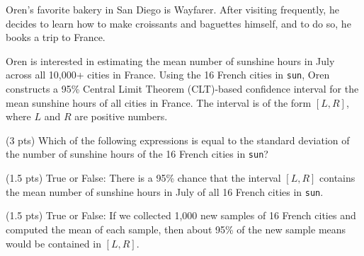 

    


\newpage

\begin{prob}[(17 pts)]

Oren's favorite bakery in San Diego is Wayfarer. After visiting frequently, he decides to learn how to make croissants and baguettes himself, and to do so, he books a trip to France.

Oren is interested in estimating the mean number of sunshine hours in July across all 10,000+ cities in France. Using the 16 French cities in \texttt{sun}, Oren constructs a 95\% Central Limit Theorem (CLT)-based confidence interval for the mean sunshine hours of all cities in France. The interval is of the form $[L, R]$, where $L$ and $R$ are positive numbers.

\begin{subprobset}

\begin{subprob}(3 pts) Which of the following expressions is equal to the standard deviation of the number of sunshine hours of the 16 French cities in \texttt{sun}?


\end{subprob}

\begin{subprob}(1.5 pts) True or False: There is a 95\% chance that the interval $[L, R]$ contains the mean number of sunshine hours in July of all 16 French cities in \texttt{sun}.


\end{subprob}

\begin{subprob}(1.5 pts) True or False: If we collected 1,000 new samples of 16 French cities and computed the mean of each sample, then about 95\% of the new sample means would be contained in $[L, R]$.


\end{subprob}
\end{subprobset}
\end{prob}

